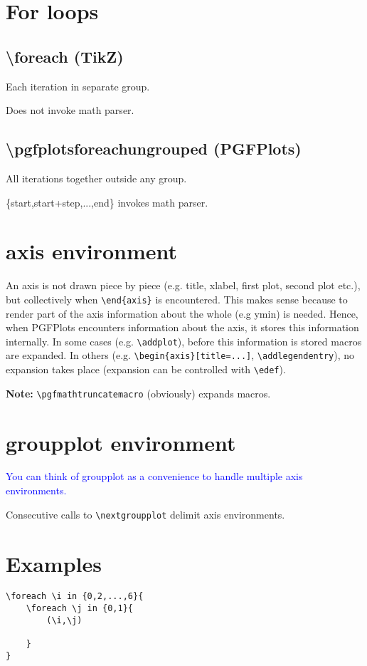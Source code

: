 \documentclass{article}
\begin{document}
\section{For loops}
\subsection{\textbackslash foreach (TikZ)}
Each iteration in separate group.

Does not invoke math parser.

\subsection{\textbackslash pgfplotsforeachungrouped (PGFPlots)}
All iterations together outside any group.

\{start,start+step,...,end\} invokes math parser.

\section{axis environment}
An axis is not drawn piece by piece (e.g. title, xlabel, first plot, second plot etc.), but collectively when \lstinline!\end{axis}! is encountered. This makes sense because to render part of the axis information about the whole (e.g ymin) is needed. Hence, when PGFPlots encounters information about the axis, it stores this information internally. In some cases (e.g. \lstinline!\addplot!), before this information is stored macros are expanded. In others (e.g. \lstinline!\begin{axis}[title=...]!, \lstinline!\addlegendentry!), no expansion takes place (expansion can be controlled with \lstinline!\edef!).

\textbf{Note:} \lstinline!\pgfmathtruncatemacro! (obviously) expands macros.

\section{groupplot environment}
\textcolor{blue}{You can think of groupplot as a convenience to handle multiple axis environments.}

Consecutive calls to \lstinline!\nextgroupplot! delimit axis environments.

\section{Examples}
\begin{lstlisting}[caption={Output is (0,0), (0,1), (2,0), (2,1), (4,0), (4,1), (6,0), (6,1) separated by newlines. After the double loop, \textbackslash i and \textbackslash j have the values they had before the loop. If we instead use \textbackslash pgfplotsforeachungrouped, \textbackslash i and \textbackslash j would be 6 and 1 respectively.}]
\foreach \i in {0,2,...,6}{
    \foreach \j in {0,1}{
        (\i,\j)

    }
}
\end{lstlisting}
\end{document}
